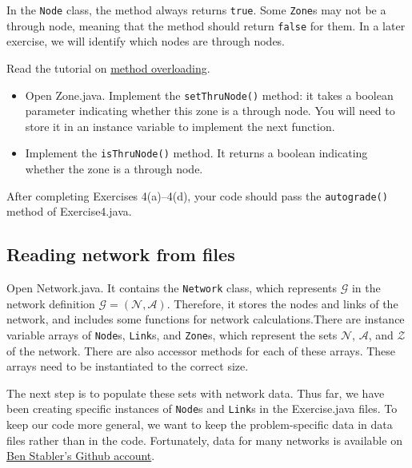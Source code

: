 \documentclass[11pt]{article}
\newcommand{\N}{\mathcal{N}}
\newcommand{\A}{\mathcal{A}}
\newcommand{\Z}{\mathcal{Z}}
\begin{document}
In the \texttt{Node} class, the method always returns \texttt{true}. Some \texttt{Zone}s may not be a through node, meaning that the method should return \texttt{false} for them. In a later exercise, we will identify which nodes are through nodes.

Read the tutorial on \href{https://www.w3schools.com/java/java_methods_overloading.asp}{method overloading}. \begin{itemize}
	\item Open Zone.java. Implement the \texttt{setThruNode()} method: it takes a boolean parameter indicating whether this zone is a through node. You will need to store it in an instance variable to implement the next function.
	\item Implement the \texttt{isThruNode()} method. It returns a boolean indicating whether the zone is a through node.
\end{itemize}



 \vspace{\baselineskip}

\noindent
After completing Exercises 4(a)--4(d), your code should pass the \texttt{autograde()} method of Exercise4.java. 





\subsection{Reading network from files}
\label{sec33}


Open Network.java. It contains the \texttt{Network} class, which represents $\mathcal{G}$ in the network definition $\mathcal{G}=(\N, \A)$. Therefore, it stores the nodes and links of the network, and includes some functions for network calculations.There are instance variable arrays of \texttt{Node}s, \texttt{Link}s, and \texttt{Zone}s, which represent the sets $\N$, $\A$, and $\Z$ of the network. There are also accessor methods for each of these arrays. These arrays need to be instantiated to the correct size. 

The next step is to populate these sets with network data. Thus far, we have been creating specific instances of \texttt{Node}s and \texttt{Link}s in the Exercise.java files. To keep our code more general, we want to keep the problem-specific data in data files rather than in the code. Fortunately, data for many networks is available on \href{https://github.com/bstabler/TransportationNetworks}{Ben Stabler's Github account}. 
\end{document}

